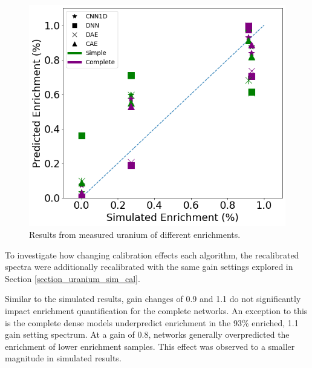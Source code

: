 \begin{figure}[H]
	\centering
	\includegraphics[width=0.8\linewidth]{images/measured_uranium.png}
	\caption{Results from measured uranium of different enrichments.}
	\label{fig:measured_uranium}
\end{figure}

To investigate how changing calibration effects each algorithm, the recalibrated spectra were additionally recalibrated with the same gain settings explored in Section \ref{section_uranium_sim_cal}. 

Similar to the simulated results, gain changes of 0.9 and 1.1 do not significantly impact enrichment quantification for the complete networks. An exception to this is the complete dense models underpredict enrichment in the 93\% enriched, 1.1 gain setting spectrum. At a gain of 0.8, networks generally overpredicted the enrichment of lower enrichment samples. This effect was observed to a smaller magnitude in simulated results.

